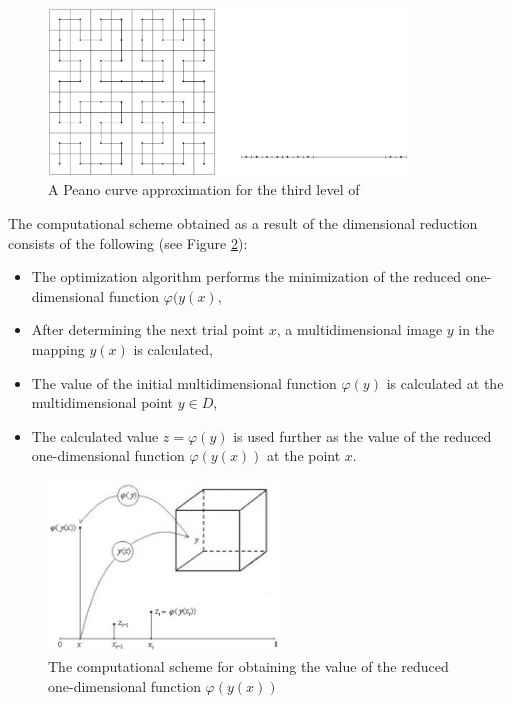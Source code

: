 \documentclass{gOMS2e}
\theoremstyle{plain}%
\theoremstyle{definition}
\theoremstyle{remark}
\begin{document}
\begin{figure}[h!]
    \centering
		\includegraphics[width=0.85\textwidth]{pictures/peanoC.eps}
		\caption{A Peano curve approximation for the third level of}
    \label{fig:peanoC}
\end{figure}

\par
The computational scheme obtained as a result of the dimensional reduction consists of the following (see Figure \ref{fig:peanoCUsage}):
\begin{itemize}
  \item The optimization algorithm performs the minimization of the reduced one-dimensional function \(\varphi(y(x)\),
  \item After determining the next trial point \(x\), a multidimensional image \(y\) in the mapping \(y(x)\) is calculated,
  \item The value of the initial multidimensional function \(\varphi(y)\) is calculated at the multidimensional point \(y\in D\),
  \item The calculated value \(z=\varphi(y)\) is used further as the value of the reduced one-dimensional function \(\varphi(y(x))\) at the point \(x\).
\end{itemize}

\begin{figure}[h!]
    \centering
		\includegraphics[width=0.55\textwidth]{pictures/peanoCUsage.eps}
		\caption{The computational scheme for obtaining the value of the reduced one-dimensional function \(\varphi(y(x))\)}
    \label{fig:peanoCUsage}
\end{figure}
\end{document}
